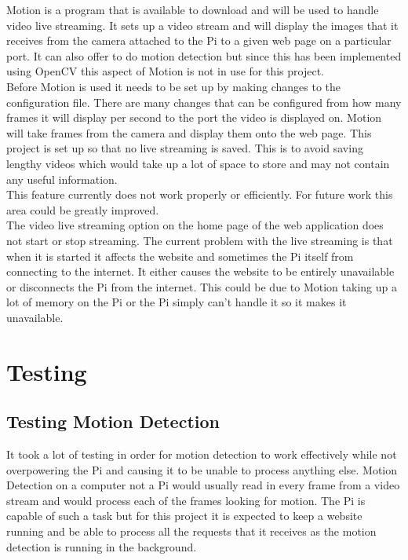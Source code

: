 \documentclass[12pt]{report}
\begin{document}
Motion is a program that is available to download and will be used to handle video live streaming. It sets up a video stream and will display the images that it receives from the camera attached to the Pi to a given web page on a particular port. It can also offer to do motion detection but since this has been implemented using OpenCV this aspect of Motion is not in use for this project.\\

Before Motion is used it needs to be set up by making changes to the configuration file. There are many changes that can be configured from how many frames it will display per second to the port the video is displayed on. Motion will take frames from the camera and display them onto the web page. This project is set up so that no live streaming is saved. This is to avoid saving lengthy videos which would take up a lot of space to store and may not contain any useful information.\\

This feature currently does not work properly or efficiently. For future work this area could be greatly improved.\\

The video live streaming option on the home page of the web application does not start or stop streaming. The current problem with the live streaming is that when it is started it affects the website and sometimes the Pi itself from connecting to the internet. It either causes the website to be entirely unavailable or disconnects the Pi from the internet. This could be due to Motion taking up a lot of memory on the Pi or the Pi simply can't handle it so it makes it unavailable. \\


\chapter{Testing}
\label{ch:test}
%
%
\section{Testing Motion Detection}
\label{sec:motionTest}
%

It took a lot of testing in order for motion detection to work effectively while not overpowering the Pi and causing it to be unable to process anything else. Motion Detection on a computer not a Pi would usually read in every frame from a video stream and would process each of the frames looking for motion. The Pi is capable of such a task but for this project it is expected to keep a website running and be able to process all the requests that it receives as the motion detection is running in the background.\\
\end{document}
